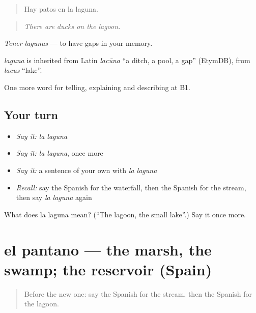 \begin{quote}
Hay patos en la laguna.
\end{quote}

\begin{quote}
\emph{There are ducks on the lagoon.}
\end{quote}

\emph{Tener lagunas} — to have gaps in your memory.

\begin{cousinweb}
\emph{laguna} is inherited from Latin \emph{lacūna} \textquotedblleft{}a ditch, a pool, a gap\textquotedblright{} (EtymDB), from \emph{lacus} \textquotedblleft{}lake\textquotedblright{}.
\end{cousinweb}

\begin{grammarlens}[title={What you've built}]
One more word for telling, explaining and describing at B1.
\end{grammarlens}

\subsection*{Your turn}
\begin{itemize}
\raggedright
  \item \emph{Say it:} \emph{la laguna}
  \item \emph{Say it:} \emph{la laguna}, once more
  \item \emph{Say it:} a sentence of your own with \emph{la laguna}
  \item \emph{Recall:} say the Spanish for the waterfall, then the Spanish for the stream, then say \emph{la laguna} again
\end{itemize}

\begin{tcolorbox}[breakable,colback=teal!4,colframe=teal!35!black,title={Before you move on}]
What does la laguna mean? (\textquotedblleft{}The lagoon, the small lake\textquotedblright{}.) Say it once more.
\end{tcolorbox}
\section[el pantano]{el pantano — the marsh, the swamp; the reservoir (Spain)}

\label{lesson:ES-C689-pantano}



\begin{quote}
Before the new one: say the Spanish for the stream, then the Spanish for the lagoon.
\end{quote}


